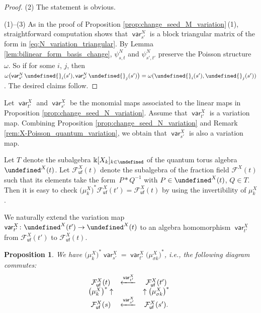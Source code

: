 \documentclass[10pt,a4paper]{amsart}
\newcommand{\kk}{\Bbbk}
\newcommand{\opname}[1]{\operatorname{\mathsf{#1}}}
\newcommand{\cF}{{\mathcal F}}
\newcommand{\var}{\opname{var}}
\newcommand{\ufv}{\opname{uf}}
\let\Iufv\undefined
\let\LP\undefined
\let\ee\undefined
\newcommand{\Iufv}{I_{\ufv}}
\newcommand{\LP}{{\mathcal{LP}}}
\newcommand{\ee}{\mathbf{e}}
\numberwithin{equation}{section}
\newtheorem{Proposition}[Theorem]{Proposition}
 { \theoremstyle{definition}
\newtheorem{Definition}[Theorem]{Definition}
\newtheorem{Note}[Theorem]{Note}
\newtheorem{Example}[Theorem]{Example}
\newtheorem{Remark}[Theorem]{Remark}
\newtheorem{Assumption}[Theorem]{Assumption}
}
\begin{document}
\begin{proof}
(2) The statement is obvious.

(1)--(3) As in the proof of Proposition \ref{prop:change_seed_M_variation}\,(1),
straightforward computation shows that $\var_{s'}^{N}$ is a block
triangular matrix of the form in \eqref{eq:N_variation_triangular}.
By Lemma \ref{lem:bilinear_form_basis_change}, $\psi_{s,t}^{N}$
and $\psi_{s',t'}^{N}$ preserve the Poisson structure $\omega$.
So if \smash{$\omega\bigl(\var_{t'}^{N}\ee{}_{i}(t'),\var_{t'}^{N}\ee{}_{j}(t')\bigr)=\omega(\ee{}_{i}(t'),\ee{}_{j}(t'))$}
for some $i$, $j$, then $\omega\bigl(\var_{s'}^{N}\ee{}_{i}(s'),\var_{s'}^{N}\ee{}_{j}(s')\bigr)=\omega(\ee{}_{i}(s'),\ee{}_{j}(s'))$.
The desired claims follow.
\end{proof}

Let $\var_{t'}^{X}$ and $\var_{s'}^{X}$ be the monomial maps associated to the linear maps in Proposition \ref{prop:change_seed_N_variation}. Assume that $\var_{t'}^{X}$ is a variation map. Combining Proposition \ref{prop:change_seed_N_variation} and Remark \ref{rem:X-Poisson_quantum_variation}, we obtain that $\var_{s'}^{X}$ is also a variation map.

Let $T$ denote the subalgebra $\kk[X_k]_{k\in \Iufv}$ of the quantum torus algebra $\LP^X(t)$. Let $\cF_{\ufv}^X(t)$ denote the subalgebra of the fraction field $\cF^X(t)$ such that its elements take the form~$P*Q^{-1}$ with $P\in \LP^X(t)$, $Q\in T$. Then it is easy to check $\big(\mu_k^X\big)^* \cF_{\ufv}^X(t')=\cF_{\ufv}^X(t)$ by using the invertibility of $\mu_k^X$.

We naturally extend the variation map $\var_{t'}^X\colon\LP^X(t')\rightarrow\LP^X(t)$ to an algebra homomorphism $\var_{t'}^X$ from $\cF_{\ufv}^X(t')$ to $\cF_{\ufv}^X(t)$.

\begin{Proposition}\label{prop:change_seed_X_variation}
We have $\big(\mu_{k}^{X}\big)^{*}\var_{s'}^{X}=\var_{t'}^{X}\big(\mu_{\sigma k}^{X}\big)^{*}$,
i.e., the following diagram commutes:
\begin{align*}
 \begin{array}{@{}ccc}
 \cF^X_{\ufv}(t) & \xleftarrow{\var_{t'}^{X}} & \cF^X_{\ufv}(t')\\
 \big(\mu_{k}^{X}\big)^{*}\uparrow & & \uparrow\big(\mu_{\sigma k}^{X}\big)^{*}\\
 \cF^X_{\ufv}(s) & \xleftarrow{\var_{s'}^{X}} & \cF^X_{\ufv}(s').
 \end{array}
 \end{align*}
\end{Proposition}
\end{document}
